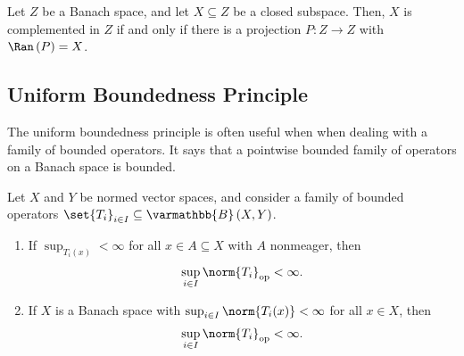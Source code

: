 \documentclass[10pt]{mypackage}
\renewcommand*{\mathbb}[1]{\varmathbb{#1}}
\newcommand{\B}{\mathbb{B}}
\begin{document}
  \begin{corollary}
    Let $Z$ be a Banach space, and let $X\subseteq Z$ be a closed subspace. Then, $X$ is complemented in $Z$ if and only if there is a projection $P: Z\rightarrow Z$ with $\Ran\left(P\right) = X$.
  \end{corollary}
  \subsection{Uniform Boundedness Principle}%
  The uniform boundedness principle is often useful when when dealing with a family of bounded operators. It says that a pointwise bounded family of operators on a Banach space is bounded.
  \begin{theorem}
    Let $X$ and $Y$ be normed vector spaces, and consider a family of bounded operators $\set{T_i}_{i\in I}\subseteq \B\left(X,Y\right)$.
    \begin{enumerate}[(1)]
      \item If $\sup_{T_i(x)} < \infty$ for all $x\in A\subseteq X$ with $A$ nonmeager, then
        \begin{align*}
          \sup_{i\in I}\norm{T_i}_{\text{op}} < \infty.
        \end{align*}
      \item If $X$ is a Banach space with $\sup_{i\in I}\norm{T_i(x)} < \infty$ for all $x\in X$, then
        \begin{align*}
          \sup_{i\in I}\norm{T_i}_{\text{op}} < \infty.
        \end{align*}
    \end{enumerate}
  \end{theorem}
\end{document}

